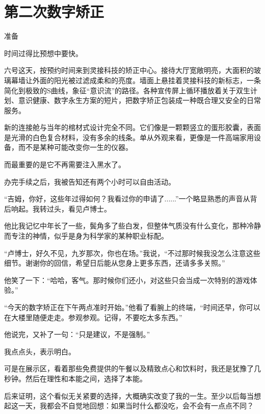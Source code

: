 \chapter{第二次数字矫正}

准备

时间过得比预想中要快。

六号这天，按预约时间来到灵接科技的矫正中心。接待大厅宽敞明亮，大面积的玻璃幕墙让外面的阳光被过滤成柔和的亮度。墙面上悬挂着灵接科技的新标志，一条简化到极致的S曲线，象征“意识流”的路径。各种宣传屏上循环播放着关于双生计划、意识健康、数字永生方案的短片，把数字矫正包装成一种既合理又安全的日常服务。

新的连接舱与当年的棺材式设计完全不同。它们像是一颗颗竖立的蛋形胶囊，表面是光滑的白色复合材料，没有多余的线条。单从外观来看，更像是一件高端家用设备，而不是某种可能改变你一生的仪器。

而最重要的是它不再需要注入黑水了。

办完手续之后，我被告知还有两个小时可以自由活动。

“吉姆，你好，这些年过得如何？我看过你的申请了......”一个略显熟悉的声音从背后响起。我转过头，看见卢博士。

他比我记忆中年长了一些，鬓角多了些白发，但整体气质没有什么变化，那种冷静而专注的神情，似乎是身为科学家的某种职业标配。

“卢博士，好久不见，九岁那次，你也在场。”我说，“不过那时候我没怎么注意这些细节。谢谢你的回信，希望日后能从您身上更多东西，还请多多关照。”

他笑了一下：“哈哈，客气。那时候你们还小，对这些只会当成一次特别的游戏体验。”

“今天的数字矫正在下午两点准时开始。”他看了看腕上的终端，“时间还早，你可以在大楼里随便走走。参观参观。记得，不要吃太多东西。”

他说完，又补了一句：“只是建议，不是强制。”

我点点头，表示明白。

可是在展示区，看着那些免费提供的午餐以及精致点心和饮料时，我还是犹豫了几秒钟。然后在理性和本能之间，选择了本能。

后来证明，这个看似无关紧要的选择，大概确实改变了我的一生。至少以后每当想起这一天，我都会不自觉地回想：如果当时什么都没吃，会不会有一点点不同？
